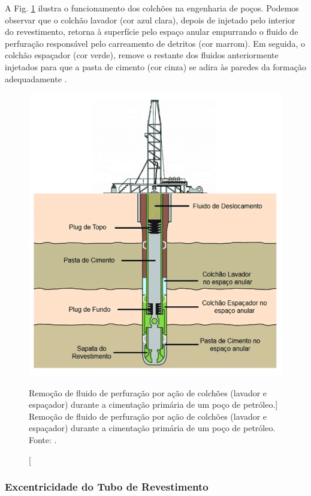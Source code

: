 A Fig. \ref{fig:remocao_fluido} ilustra o funcionamento dos colchões na engenharia de poços. Podemos observar que o colchão lavador (cor azul clara), depois de injetado pelo interior do revestimento, retorna à superfície pelo espaço anular empurrando o fluido de perfuração responsável pelo carreamento de detritos (cor marrom). Em seguida, o colchão espaçador (cor verde), remove o restante dos fluidos anteriormente injetados para que a pasta de cimento (cor cinza) se adira às paredes da formação adequadamente \cite{Campos}.
\begin{figure}[H]
    \centering
    \includegraphics[scale=0.35]{img/remocao_fluido.png}
    \caption
    [Remoção de fluido de perfuração por ação de colchões (lavador e espaçador) durante a cimentação primária de um poço de petróleo.]
    {Remoção de fluido de perfuração por ação de colchões (lavador e espaçador) durante a cimentação primária de um poço de petróleo. Fonte: \cite{Curbelo}.}
    \label{fig:remocao_fluido}
\end{figure}
		
	
\subsubsection{Excentricidade do Tubo de Revestimento}

